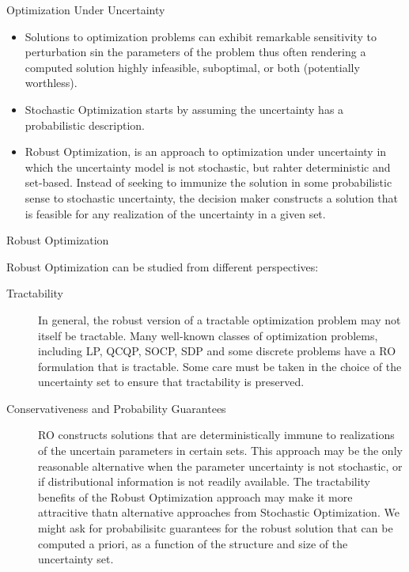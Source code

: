 \documentclass{beamer}
\begin{document}
\begin{frame}{Optimization Under Uncertainty}
\begin{itemize}
\item Solutions to optimization problems can exhibit remarkable sensitivity to perturbation sin the parameters of the problem thus often rendering a computed solution highly infeasible, suboptimal, or both (potentially worthless). \\

\item Stochastic Optimization starts by assuming the uncertainty has a probabilistic description. \\

\item Robust Optimization, is an approach to optimization under uncertainty in which the uncertainty model is not stochastic, but rahter deterministic and set-based. Instead of seeking to immunize the solution in some probabilistic sense to stochastic uncertainty, the decision maker constructs a solution that is feasible for any realization of the uncertainty in a given set. \\
\end{itemize}
\end{frame}

\begin{frame}{Robust Optimization}

Robust Optimization can be studied from different perspectives:
\begin{description}
\item [Tractability] In general, the robust version of a tractable optimization problem may not itself be tractable. Many well-known classes of optimization problems, including LP, QCQP, SOCP, SDP and some discrete problems have a RO formulation that is tractable. Some care must be taken in the choice of the uncertainty set to ensure that tractability is preserved.
\end{description}
\end{frame}
\begin{frame}{}
\begin{description}
\item [Conservativeness and Probability Guarantees] RO constructs solutions that are deterministically immune to realizations of the uncertain parameters in certain sets. This approach may be the only reasonable alternative when the parameter uncertainty is not stochastic, or if distributional information is not readily available. The tractability benefits of the Robust Optimization approach may make it more attracitive thatn alternative approaches from Stochastic Optimization. We might ask for probabilisitc guarantees for the robust solution that can be computed a priori, as a function of the structure and size of the uncertainty set.
\end{description}
\end{frame}
\end{document}
